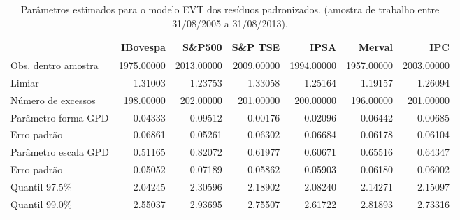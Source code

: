\begin{table}[H]
\centering
\caption{Parâmetros estimados para o modelo EVT dos resíduos padronizados. 
               (amostra de trabalho entre 31/08/2005 a 31/08/2013).} 
\label{tab:evtcoef}
\begin{tabular}{lrrrrrr}
  \hline
 & IBovespa & S\&P500 & S\&P TSE & IPSA & Merval & IPC \\ 
  \hline
Obs. dentro amostra & 1975.00000 & 2013.00000 & 2009.00000 & 1994.00000 & 1957.00000 & 2003.00000 \\ 
  Limiar & 1.31003 & 1.23753 & 1.33058 & 1.25164 & 1.19157 & 1.26094 \\ 
  Número de excessos & 198.00000 & 202.00000 & 201.00000 & 200.00000 & 196.00000 & 201.00000 \\ 
  Parâmetro forma GPD & 0.04333 & -0.09512 & -0.00176 & -0.02096 & 0.06442 & -0.00685 \\ 
  Erro padrão & 0.06861 & 0.05261 & 0.06302 & 0.06684 & 0.06178 & 0.06104 \\ 
  Parâmetro escala GPD & 0.51165 & 0.82072 & 0.61977 & 0.60671 & 0.65516 & 0.64347 \\ 
  Erro padrão & 0.05052 & 0.07189 & 0.05862 & 0.05903 & 0.06180 & 0.06002 \\ 
  Quantil 97.5\% & 2.04245 & 2.30596 & 2.18902 & 2.08240 & 2.14271 & 2.15097 \\ 
  Quantil 99.0\% & 2.55037 & 2.93695 & 2.75507 & 2.61722 & 2.81893 & 2.73316 \\ 
   \hline
\end{tabular}
\end{table}
